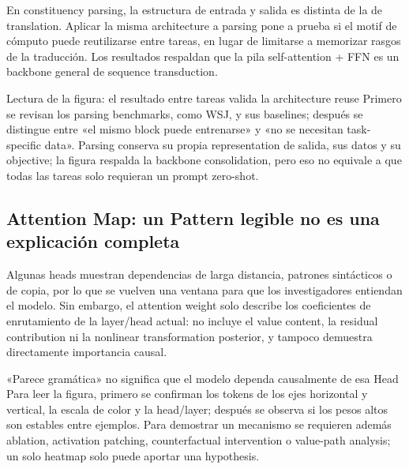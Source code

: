 En constituency parsing, la estructura de entrada y salida es distinta de la de translation. Aplicar la misma architecture a parsing pone a prueba si el motif de cómputo puede reutilizarse entre tareas, en lugar de limitarse a memorizar rasgos de la traducción. Los resultados respaldan que la pila self-attention + FFN es un backbone general de sequence transduction.


\begin{knowledgebox}{Lectura de la figura: el resultado entre tareas valida la architecture reuse}
Primero se revisan los parsing benchmarks, como WSJ, y sus baselines; después se distingue entre «el mismo block puede entrenarse» y «no se necesitan task-specific data». Parsing conserva su propia representation de salida, sus datos y su objective; la figura respalda la backbone consolidation, pero eso no equivale a que todas las tareas solo requieran un prompt zero-shot.
\end{knowledgebox}

\subsection{Attention Map: un Pattern legible no es una explicación completa}

Algunas heads muestran dependencias de larga distancia, patrones sintácticos o de copia, por lo que se vuelven una ventana para que los investigadores entiendan el modelo. Sin embargo, el attention weight solo describe los coeficientes de enrutamiento de la layer/head actual: no incluye el value content, la residual contribution ni la nonlinear transformation posterior, y tampoco demuestra directamente importancia causal.


\begin{warningbox}{«Parece gramática» no significa que el modelo dependa causalmente de esa Head}
Para leer la figura, primero se confirman los tokens de los ejes horizontal y vertical, la escala de color y la head/layer; después se observa si los pesos altos son estables entre ejemplos. Para demostrar un mecanismo se requieren además ablation, activation patching, counterfactual intervention o value-path analysis; un solo heatmap solo puede aportar una hypothesis.
\end{warningbox}

